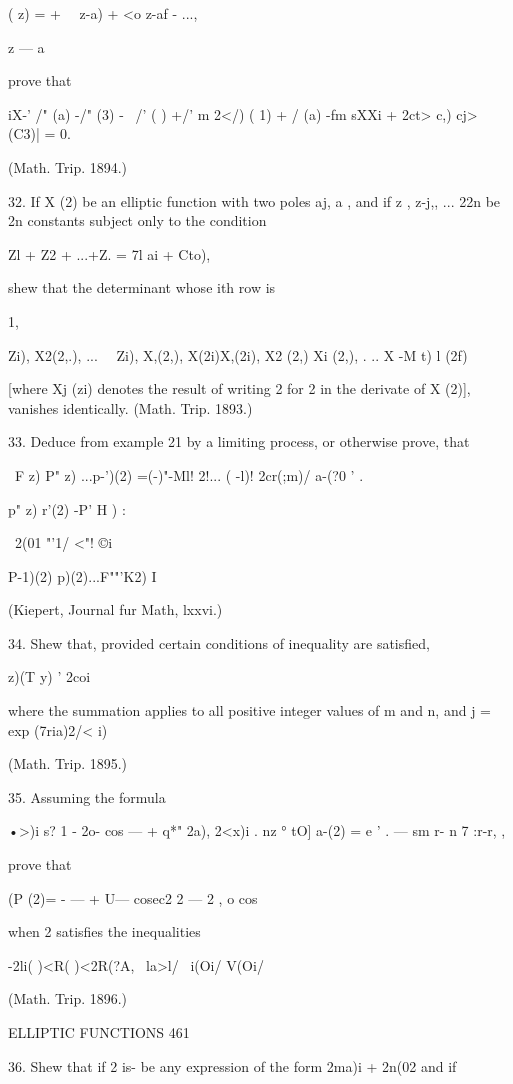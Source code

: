 {( z) = + \ \ z-a) + <o z-af - ...,

z — a

prove that

iX-' /" (a) -/" (3) - \ /' ( ) +/' m 2</) ( 1) + / (a) -fm sXXi + 2ct>
c,) cj> (C3)| = 0.

(Math. Trip. 1894.)

32. If X (2) be an elliptic function with two poles aj, a , and if z ,
z-j,, ... 22n be 2n constants subject only to the condition

Zl + Z2 + ...+Z. = 7l ai + Cto),

shew that the determinant whose ith row is

1, \ \ {Zi), X2(2,.), ... \ \ Zi), X,(2,), X(2i)X,(2i), X2 (2,) Xi
(2,), . .. X -M t) l (2f)

[where Xj (zi) denotes the result of writing 2 for 2 in the derivate
of X (2)], vanishes identically. (Math. Trip. 1893.)

33. Deduce from example 21 by a limiting process, or otherwise prove,
that

\ F z) P" z) ...p-')(2) =(-)"-Ml! 2!... ( -l)! 2cr(;m)/ a-(?0 ' .

p" z) r'(2) -P' H ) :



\ 2(01 "'1/ <"! ©i



P-1)(2) p)(2)...F""'K2) I

(Kiepert, Journal fur Math, lxxvi.)

34. Shew that, provided certain conditions of inequality are
satisfied,

  z)(T y) ' 2coi

where the summation applies to all positive integer values of m and n,
and j = exp (7ria)2/< i)

(Math. Trip. 1895.)

35. Assuming the formula

•>)i s? 1 - 2o- cos — + q*" 2a), 2<x)i . nz ° tO] a-(2) = e ' . — sm
r- n 7 :r-r, ,

prove that

(P (2)= - — + U— cosec2 2 — 2 , o cos

when 2 satisfies the inequalities

-2li( )<R( )<2R(?A, \ la>l/ \ i(Oi/ V(Oi/

(Math. Trip. 1896.)



ELLIPTIC FUNCTIONS 461

36. Shew that if 2 is- be any expression of the form 2ma)i + 2n(02 and
if

}}
